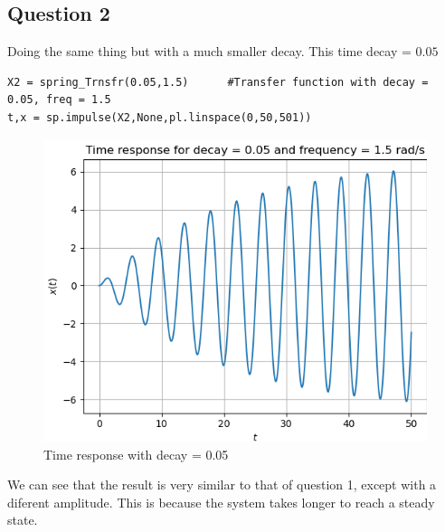 \documentclass[11pt, a4paper]{article}
\begin{document}
\subsection{Question 2}
Doing the same thing but with a much smaller decay. This time decay = $0.05$
    \begin{verbatim}
X2 = spring_Trnsfr(0.05,1.5)      #Transfer function with decay = 0.05, freq = 1.5
t,x = sp.impulse(X2,None,pl.linspace(0,50,501))
    \end{verbatim}
    \begin{figure}[!h]
        \centering
        \includegraphics[scale = 0.8]{Figure 2.png}
        \caption{Time response with decay = 0.05}
        \label{fig:Figure 2}
    \end{figure}
    
    We can see that the result is very similar to that of question 1, except with a diferent amplitude. This is because the system takes longer to reach a steady state.
    
\end{document}
